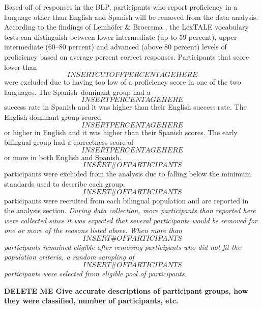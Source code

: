 Based off of responses in the BLP, participants who report proficiency in a language other than English and Spanish will be removed from the data analysis. According to the findings of Lemhöfer \& Broersma \parencite*{Lemhofer2012-hz}, the LexTALE vocabulary tests can distinguish between lower intermediate (up to 59 percent), upper intermediate (60–80 percent) and advanced (above 80 percent) levels of proficiency based on average percent correct responses. Participants that score lower than \[INSERT CUTOFF PERCENTAGE HERE\] were excluded due to having too low of a proficiency score in one of the two languages. The Spanish–dominant group had a  \[INSERT PERCENTAGE HERE\] success rate in Spanish and it was higher than their English success rate. The English-dominant group scored \[INSERT PERCENTAGE HERE\] or higher in English and it was higher than their Spanish scores. The early bilingual group had a correctness score of \[INSERT PERCENTAGE HERE\] or more in both English and Spanish. \[INSERT \# OF PARTICIPANTS\] participants were excluded from the analysis due to falling below the minimum standards used to describe each group. \[INSERT \# OF PARTICIPANTS\]  participants were recruited from each bilingual population and are reported in the analysis section. 
\emph{During data collection, more participants than reported here were collected since it was expected that several participants would be removed for one or more of the reasons listed above. When more than \[INSERT \# OF PARTICIPANTS\] participants remained eligible after removing participants who did not fit the population criteria, a random sampling of \[INSERT \# OF PARTICIPANTS\] participants were selected from eligible pool of participants.}

\textbf{DELETE ME Give accurate descriptions of participant groups, how they were classified, number of participants, etc.}


